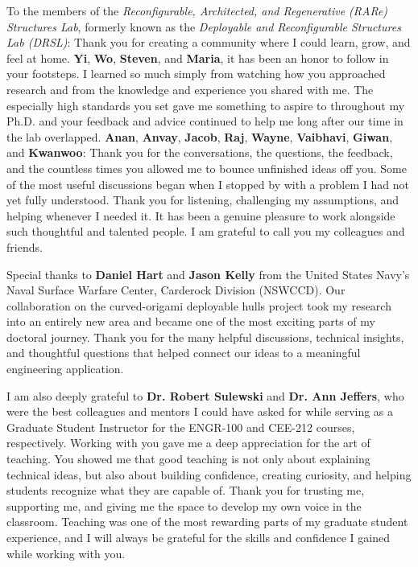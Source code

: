 To the members of the \textit{Reconfigurable, Architected, and Regenerative (RARe) Structures Lab}, formerly known as the \textit{Deployable and Reconfigurable Structures Lab (DRSL)}: Thank you for creating a community where I could learn, grow, and feel at home. \textbf{Yi}, \textbf{Wo}, \textbf{Steven}, and \textbf{Maria}, it has been an honor to follow in your footsteps. I learned so much simply from watching how you approached research and from the knowledge and experience you shared with me. The especially high standards you set gave me something to aspire to throughout my Ph.D. and your feedback and advice continued to help me long after our time in the lab overlapped. \textbf{Anan}, \textbf{Anvay}, \textbf{Jacob}, \textbf{Raj}, \textbf{Wayne}, \textbf{Vaibhavi}, \textbf{Giwan}, and \textbf{Kwanwoo}: Thank you for the conversations, the questions, the feedback, and the countless times you allowed me to bounce unfinished ideas off you. Some of the most useful discussions began when I stopped by with a problem I had not yet fully understood. Thank you for listening, challenging my assumptions, and helping whenever I needed it. It has been a genuine pleasure to work alongside such thoughtful and talented people. I am grateful to call you my colleagues and friends.

Special thanks to \textbf{Daniel Hart} and \textbf{Jason Kelly} from the United States Navy's Naval Surface Warfare Center, Carderock Division (NSWCCD). Our collaboration on the curved-origami deployable hulls project took my research into an entirely new area and became one of the most exciting parts of my doctoral journey. Thank you for the many helpful discussions, technical insights, and thoughtful questions that helped connect our ideas to a meaningful engineering application.

I am also deeply grateful to \textbf{Dr. Robert Sulewski} and \textbf{Dr. Ann Jeffers}, who were the best colleagues and mentors I could have asked for while serving as a Graduate Student Instructor for the ENGR-100 and CEE-212 courses, respectively. Working with you gave me a deep appreciation for the art of teaching. You showed me that good teaching is not only about explaining technical ideas, but also about building confidence, creating curiosity, and helping students recognize what they are capable of. Thank you for trusting me, supporting me, and giving me the space to develop my own voice in the classroom. Teaching was one of the most rewarding parts of my graduate student experience, and I will always be grateful for the skills and confidence I gained while working with you.


